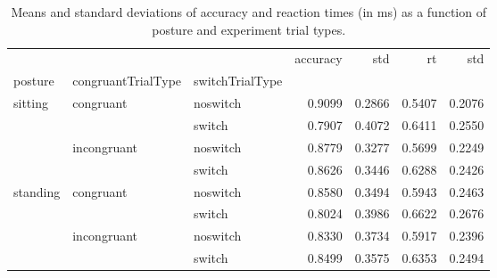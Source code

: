 \begin{table}
\centering
\caption{Means and standard deviations of accuracy and reaction times (in ms) as a function of posture and experiment trial types.}
\label{table-task-switching-replication-reaction-time}
\begin{tabular}{lllrrrr}
\toprule
         &             &        & accuracy &    std &     rt &    std \\
posture & congruantTrialType & switchTrialType &          &        &        &        \\
\midrule
sitting & congruant & noswitch &   0.9099 & 0.2866 & 0.5407 & 0.2076 \\
         &             & switch &   0.7907 & 0.4072 & 0.6411 & 0.2550 \\
         & incongruant & noswitch &   0.8779 & 0.3277 & 0.5699 & 0.2249 \\
         &             & switch &   0.8626 & 0.3446 & 0.6288 & 0.2426 \\
standing & congruant & noswitch &   0.8580 & 0.3494 & 0.5943 & 0.2463 \\
         &             & switch &   0.8024 & 0.3986 & 0.6622 & 0.2676 \\
         & incongruant & noswitch &   0.8330 & 0.3734 & 0.5917 & 0.2396 \\
         &             & switch &   0.8499 & 0.3575 & 0.6353 & 0.2494 \\
\bottomrule
\end{tabular}
\end{table}
